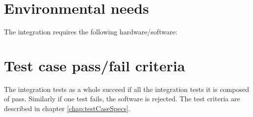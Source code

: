 \section{Environmental needs}
The integration requires the following hardware/software:

\section{Test case pass/fail criteria}
The integration tests as a whole succeed if all the integration tests it is composed of pass. Similarly if one test fails, the software is rejected.
The test criteria are described in chapter \ref{chap:testCaseSpecs}.
